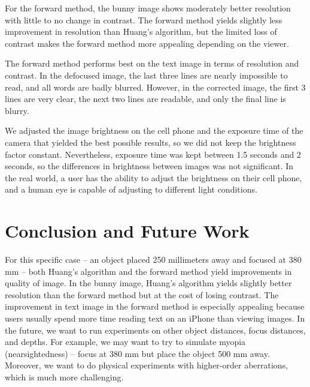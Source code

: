 For the forward method, the bunny image shows moderately better resolution with little to no change in contrast. The forward method yields slightly less improvement in resolution than Huang’s algorithm, but the limited loss of contrast makes the forward method more appealing depending on the viewer.

The forward method performs best on the text image in terms of resolution and contrast. In the defocused image, the last three lines are nearly impossible to read, and all words are badly blurred. However, in the corrected image, the first 3 lines are very clear, the next two lines are readable, and only the final line is blurry. 

We adjusted the image brightness on the cell phone and the exposure time of the camera that yielded the best possible results, so we did not keep the brightness factor constant. Nevertheless, exposure time was kept between 1.5 seconds and 2 seconds, so the differences in brightness between images was not significant. In the real world, a user has the ability to adjust the brightness on their cell phone, and a human eye is capable of adjusting to different light conditions. 

\section{Conclusion and Future Work}
For this specific case – an object placed 250 millimeters away and focused at 380 mm – both Huang’s algorithm and the forward method yield improvements in quality of image. In the bunny image, Huang’s algorithm yields slightly better resolution than the forward method but at the cost of losing contrast. The improvement in text image in the forward method is especially appealing because users usually spend more time reading text on an iPhone than viewing images. 
In the future, we want to run experiments on other object distances, focus distances, and depths. For example, we may want to try to simulate myopia (nearsightedness) – focus at 380 mm but place the object 500 mm away. Moreover, we want to do physical experiments with higher-order aberrations, which is much more challenging.